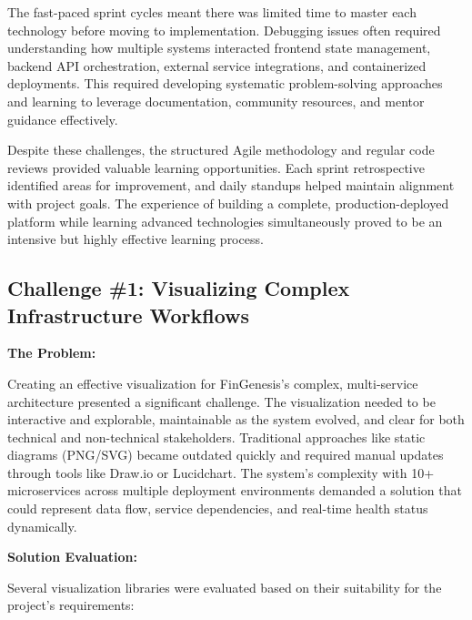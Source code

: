 The fast-paced sprint cycles meant there was limited time to master each technology before moving to implementation. Debugging issues often required understanding how multiple systems interacted frontend state management, backend API orchestration, external service integrations, and containerized deployments. This required developing systematic problem-solving approaches and learning to leverage documentation, community resources, and mentor guidance effectively.

Despite these challenges, the structured Agile methodology and regular code reviews provided valuable learning opportunities. Each sprint retrospective identified areas for improvement, and daily standups helped maintain alignment with project goals. The experience of building a complete, production-deployed platform while learning advanced technologies simultaneously proved to be an intensive but highly effective learning process.

\subsection{Challenge \#1: Visualizing Complex Infrastructure Workflows}

\textbf{The Problem:}

Creating an effective visualization for FinGenesis's complex, multi-service architecture presented a significant challenge. The visualization needed to be interactive and explorable, maintainable as the system evolved, and clear for both technical and non-technical stakeholders. Traditional approaches like static diagrams (PNG/SVG) became outdated quickly and required manual updates through tools like Draw.io or Lucidchart. The system's complexity with 10+ microservices across multiple deployment environments demanded a solution that could represent data flow, service dependencies, and real-time health status dynamically.

\textbf{Solution Evaluation:}

Several visualization libraries were evaluated based on their suitability for the project's requirements:

\begin{table}[H]
\centering
\caption{Visualization Library Comparison}
\end{table}

